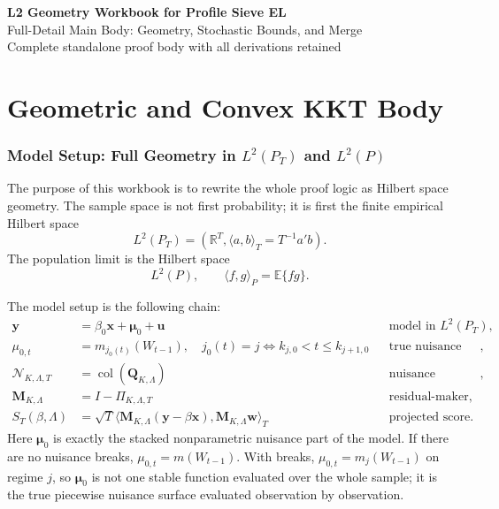 \documentclass[12pt]{article}
\numberwithin{equation}{section}
\theoremstyle{definition}
\newcommand{\E}{\mathbb E}
\newcommand{\R}{\mathbb R}
\newcommand{\N}{\mathcal N}
\newcommand{\LtwoT}{L^2(P_T)}
\newcommand{\LtwoP}{L^2(P)}
\newcommand{\innerT}[2]{\langle #1,#2\rangle_T}
\newcommand{\innerP}[2]{\langle #1,#2\rangle_P}
\begin{document}
\begin{center}
{\Large\bf L2 Geometry Workbook for Profile Sieve EL}\\[6pt]
{\large Full-Detail Main Body: Geometry, Stochastic Bounds, and Merge}\\[6pt]
{\normalsize Complete standalone proof body with all derivations retained}\\[12pt]
\end{center}

\tableofcontents
\newpage

\part{Geometric and Convex KKT Body}

\section{Model Setup: Full Geometry in \texorpdfstring{\(L^2(P_T)\)}{L2PT} and \texorpdfstring{\(L^2(P)\)}{L2P}}

The purpose of this workbook is to rewrite the whole proof logic as Hilbert
space geometry. The sample space is not first probability; it is first the
finite empirical Hilbert space
\[
    \LtwoT=(\R^T,\innerT{a}{b}=T^{-1}a'b).
\]
The population limit is the Hilbert space
\[
    \LtwoP,\qquad \innerP{f}{g}=\E\{fg\}.
\]

The model setup is the following chain:
\[
\begin{aligned}
\bm y&=\beta_0\bm x+\bm\mu_0+\bm u
&&\text{model in }\LtwoT,\\
\mu_{0,t}&=m_{j_0(t)}(W_{t-1}),\quad
j_0(t)=j\iff k_{j,0}<t\le k_{j+1,0}
&&\text{true nuisance vector},\\
\N_{K,\Lambda,T}&=\operatorname{col}(\bm Q_{K,\Lambda})
&&\text{nuisance subspace},\\
\bm M_{K,\Lambda}&=I-\Pi_{K,\Lambda,T}
&&\text{residual-maker},\\
S_T(\beta,\Lambda)&=\sqrt T\innerT{\bm M_{K,\Lambda}(\bm y-\beta\bm x)}
{\bm M_{K,\Lambda}\bm w}
&&\text{projected score}.
\end{aligned}
\]
Here \(\bm\mu_0\) is exactly the stacked nonparametric nuisance part of the
model. If there are no nuisance breaks, \(\mu_{0,t}=m(W_{t-1})\). With breaks,
\(\mu_{0,t}=m_j(W_{t-1})\) on regime \(j\), so \(\bm\mu_0\) is not one stable
function evaluated over the whole sample; it is the true piecewise nuisance
surface evaluated observation by observation.
\end{document}
